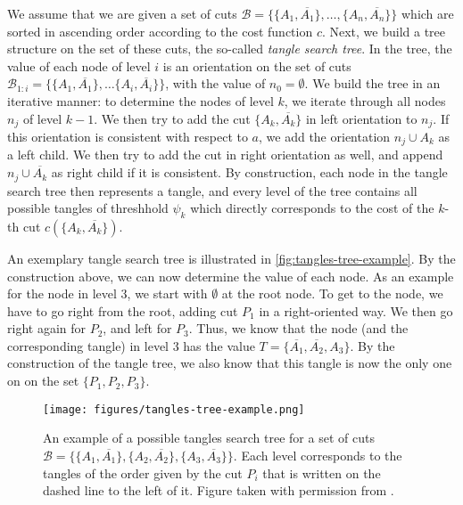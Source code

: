 We assume that we are given a set of cuts $\mathcal{B} = \{\{A_1, \overline{A_1}\}, \ldots, 
\{A_n, \overline{A_n}\}\} $ which are sorted in  
ascending order according to the cost function $c$.  Next, we build a tree structure
on the set of these cuts, the so-called \textit{tangle search tree}. 
In the tree, the value of each node of level $i$ is an orientation on the set of cuts $\mathcal{B}_{1:i} = \{\{A_1, \overline{A_1}\}, \ldots \{A_i, \overline{A_i}\}\}$, with the value of $n_0 = \emptyset$.
We build the tree in an iterative manner: to determine the nodes of level $k$, we 
iterate through all nodes $n_j$ of level $k-1$. 
We then try to add the cut $\{A_k, \overline{A_k}\}$ in left orientation to $n_j$. If this
orientation is consistent with respect to $a$, we add the orientation $n_j \cup A_k$ as a left child. 
We then try to add the cut in right orientation as well, and append $n_j \cup \overline{A_k}$ as right child if it is consistent.
By construction, each node in the tangle search tree then represents a tangle, and 
every level of the tree contains all possible tangles of threshhold $\psi_k$ which directly corresponds to the cost of the $k$-th cut $c(\{A_k, \overline{A_k}\})$. 

An exemplary tangle search tree is illustrated in \autoref{fig:tangles-tree-example}. 
By the construction above, we can now determine the value of each node. 
As an example for the node in level 3, we start with $\emptyset$ at the root node. To
get to the node, we have to go right from the root, adding cut $P_1$ in a right-oriented
way. We then go right again for $P_2$, and left for $P_3$. Thus, we know that the node (and the 
corresponding tangle) in level 3 has the value $T = \{\overline{A_1}, \overline{A_2}, A_3\}$. 
By the construction of the tangle tree, we also know that this tangle is now the only one on
on the set $\{P_1, P_2, P_3\}$.


\begin{figure}[h]
    \centering
    \texttt{[image: figures/tangles-tree-example.png]}
    \caption{An example of a possible tangles search tree for a set of cuts $\mathcal{B} = \{\{A_1, \overline{A_1}\}, \{A_2, \overline{A_2}\}, \{A_3, \overline{A_3}\} \}$. 
        Each level corresponds to the tangles of the order given by the cut $P_i$ that is written on the dashed line to the left of it.
        Figure taken with permission from \cite{klepperClusteringTanglesAlgorithmic2021}.}
    \label{fig:tangles-tree-example}
\end{figure}

